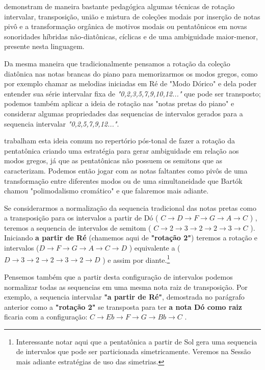 \documentclass[
	12pt,				%
	openright,			%
	twoside,			%
	a4paper,			%
	english,			%
	french,				%
	spanish,			%
	brazil				%
	]{abntex2}
\begin{document}
 demonstram de maneira bastante pedagógica algumas técnicas de rotação intervalar, transposição, união e mistura de coleções modais por inserção de notas pivô e a transformação orgânica de motivos modais ou pentatônicos em novas sonoridades híbridas não-diatônicas, cíclicas e de uma ambiguidade maior-menor, presente nesta linguagem. 

Da mesma maneira que tradicionalmente pensamos a rotação da coleção diatônica nas notas brancas do piano para memorizarmos os modos gregos, como por exemplo chamar as melodias iniciadas em Ré de "Modo Dórico" e dela poder entender sua série intervalar fixa de \textit{"0,2,3,5,7,9,10,12..."} que pode ser transposto; podemos também aplicar a ideia de rotação nas "notas pretas do piano" e considerar algumas propriedades das sequencias de intervalos gerados para a sequencia intervalar \textit{"0,2,5,7,9,12..."}.

 trabalham esta ideia comum no repertório pós-tonal de fazer a rotação da pentatônica criando uma estratégia para gerar ambiguidade em relação aos modos gregos, já que as pentatônicas não possuem os semitons que as caracterizam. Podemos então jogar com as notas faltantes como pivôs de uma transformação entre diferentes modos ou de uma simultaneidade que Bartók chamou "polimodalismo cromático" e que falaremos mais adiante. 

Se considerarmos a normalização da sequencia tradicional das notas pretas como a transposição para os intervalos a partir de Dó ( $C \rightarrow  D \rightarrow F \rightarrow G \rightarrow A \rightarrow C $ ) , teremos a sequencia de intervalos de semitom ( $C \rightarrow 2 \rightarrow  3 \rightarrow 2 \rightarrow 2  \rightarrow 3 \rightarrow C $ ). Iniciando \textbf{a partir de Ré} (chamemos aqui de \textbf{"rotação 2"}) teremos a rotação e intervalos ($D \rightarrow F \rightarrow G \rightarrow A \rightarrow C \rightarrow D $ ) equivalente a ( $  D \rightarrow 3 \rightarrow  2 \rightarrow 2 \rightarrow 3  \rightarrow 2 \rightarrow D $ ) e assim por diante.\footnote{Interessante notar aqui que a pentatônica a partir de Sol gera uma sequencia de intervalos que pode ser particionada simetricamente. Veremos na Sessão mais adiante estratégias de uso das simetrias.}

Pensemos também que a partir desta configuração de intervalos podemos normalizar todas as sequencias em uma mesma nota raiz de transposição. Por exemplo, a sequencia intervalar \textbf{"a partir de Ré"}, demostrada no parágrafo anterior como a \textbf{"rotação 2"} se transposta para ter \textbf{a nota Dó como raiz} ficaria com a configuração: $C \rightarrow Eb \rightarrow F \rightarrow G \rightarrow Bb \rightarrow C $ .
\end{document}

